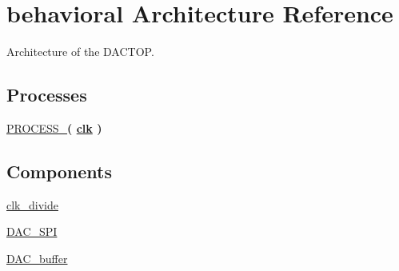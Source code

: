 \hypertarget{classdacTop_1_1behavioral}{\section{behavioral Architecture Reference}
\label{classdacTop_1_1behavioral}
}


Architecture of the D\-A\-C\-T\-O\-P.  


\subsection*{Processes}
 \begin{DoxyCompactItemize}
\item 
\hypertarget{classdacTop_1_1behavioral_a6cc276b9a3076e40ac68b8ac3f1828a7}{\hyperlink{classdacTop_1_1behavioral_a6cc276b9a3076e40ac68b8ac3f1828a7}{P\-R\-O\-C\-E\-S\-S\-\_}{\bfseries  ( {\bfseries {\bfseries \hyperlink{classdacTop_a8120037e0ee47c35ba2d79242209c72e}{clk}} \textcolor{vhdlchar}{ }\textcolor{vhdlchar}{ }} )}}\label{classdacTop_1_1behavioral_a6cc276b9a3076e40ac68b8ac3f1828a7}

\end{DoxyCompactItemize}
\subsection*{Components}
 \begin{DoxyCompactItemize}
\item 
\hyperlink{classdacTop_1_1behavioral_a904d954c80fa4089ba9eeeb9497214f2}{clk\-\_\-divide}  {\bfseries }  
\item 
\hypertarget{classdacTop_1_1behavioral_affa2663bbacf97f6ebd5b4e226f94f9f}{\hyperlink{classdacTop_1_1behavioral_affa2663bbacf97f6ebd5b4e226f94f9f}{D\-A\-C\-\_\-\-S\-P\-I}  {\bfseries }  }\label{classdacTop_1_1behavioral_affa2663bbacf97f6ebd5b4e226f94f9f}

\item 
\hypertarget{classdacTop_1_1behavioral_aee2b4aec5b20245f5b186d9084b7570a}{\hyperlink{classdacTop_1_1behavioral_aee2b4aec5b20245f5b186d9084b7570a}{D\-A\-C\-\_\-buffer}  {\bfseries }  }\label{classdacTop_1_1behavioral_aee2b4aec5b20245f5b186d9084b7570a}

\end{DoxyCompactItemize}
